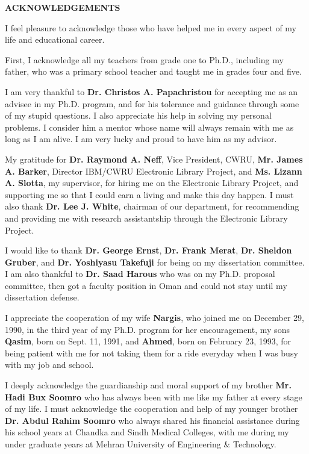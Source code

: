 \newpage
\begin{center}
{\Large \bf ACKNOWLEDGEMENTS}
\end{center}

\vspace*{0.2in}
I feel pleasure to acknowledge those who have helped me in every
aspect of my life and educational career.

First, I acknowledge all my teachers from grade one to Ph.D.,
including my father, who was a primary school teacher and taught me in
grades four and five.

I am very thankful to {\bf Dr. Christos A. Papachristou} for accepting
me as an advisee in my Ph.D. program, and for his tolerance and
guidance through some of my stupid questions. I also appreciate his
help in solving my personal problems. I consider him a mentor whose
name will always remain with me as long as I am alive. I am very lucky
and proud to have him as my advisor.

My gratitude for {\bf Dr. Raymond A. Neff}, Vice President, CWRU, {\bf
Mr. James A. Barker}, Director IBM/CWRU Electronic Library Project,
and {\bf Ms.  Lizann A. Slotta}, my supervisor, for hiring me on the
Electronic Library Project, and supporting me so that I could earn a
living and make this day happen. I must also thank {\bf Dr. Lee J.
White}, chairman of our department, for recommending and providing me
with research assistantship through the Electronic Library Project.

I would like to thank {\bf Dr. George Ernst}, {\bf Dr. Frank Merat},
{\bf Dr. Sheldon Gruber}, and {\bf Dr. Yoshiyasu Takefuji} for being
on my dissertation committee. I am also thankful to {\bf Dr. Saad
Harous} who was on my Ph.D. proposal committee, then got a faculty
position in Oman and could not stay until my dissertation defense.

I appreciate the cooperation of my wife {\bf Nargis}, who joined me on
December 29, 1990, in the third year of my Ph.D. program for her
encouragement, my sons {\bf Qasim}, born on Sept. 11, 1991, and {\bf
Ahmed}, born on February 23, 1993, for being patient with me for not
taking them for a ride everyday when I was busy with my job and
school.

I deeply acknowledge the guardianship and moral support of my brother
{\bf Mr. Hadi Bux Soomro} who has always been with me like my father
at every stage of my life. I must acknowledge the cooperation and help
of my younger brother {\bf Dr. Abdul Rahim Soomro} who always shared
his financial assistance during his school years at Chandka and Sindh
Medical Colleges, with me during my under graduate years at Mehran
University of Engineering \& Technology.

